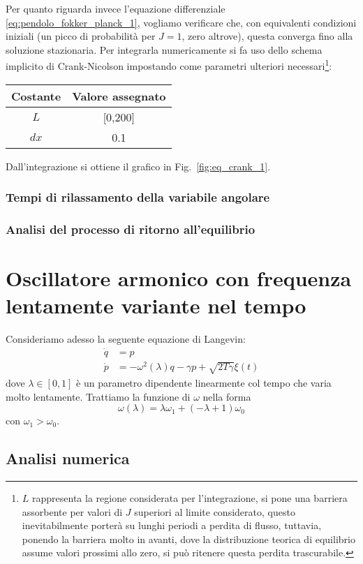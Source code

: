 \documentclass[10pt,a4paper]{article}
\begin{document}
Per quanto riguarda invece l'equazione differenziale \eqref{eq:pendolo_fokker_planck_1}, vogliamo verificare che, con equivalenti condizioni iniziali (un picco di probabilità per $J=1$, zero altrove), questa converga fino alla soluzione stazionaria. Per integrarla numericamente si fa uso dello schema implicito di Crank-Nicolson impostando come parametri ulteriori necessari\footnote{$L$ rappresenta la regione considerata per l'integrazione, si pone una barriera assorbente per valori di $J$ superiori al limite considerato, questo inevitabilmente porterà su lunghi periodi a perdita di flusso, tuttavia, ponendo la barriera molto in avanti, dove la distribuzione teorica di equilibrio assume valori prossimi allo zero, si può ritenere questa perdita trascurabile.}:
\begin{center}
	\begin{tabular}{cc}
	\toprule
	Costante & {Valore assegnato} \\
	\midrule
	$L$			& [0,200]	\\
	$dx$		& 0.1	\\
	\bottomrule
	\end{tabular}
	\label{tab:valori_2}
\end{center}
Dall'integrazione si ottiene il grafico in Fig.~\ref{fig:eq_crank_1}.



\subsubsection{Tempi di rilassamento della variabile angolare}

\subsubsection{Analisi del processo di ritorno all'equilibrio}



\section{Oscillatore armonico con frequenza lentamente variante nel tempo}

Consideriamo adesso la seguente equazione di Langevin:
\begin{align}
	\dot{q} &= p \\
	\dot{p} &= -\omega^2(\lambda)q - \gamma p + \sqrt{2T\gamma} \xi(t)
\end{align}
dove $\lambda\in[0,1]$ è un parametro dipendente linearmente col tempo che varia molto lentamente. Trattiamo la funzione di $\omega$ nella forma
\begin{equation}
 	\omega (\lambda) = \lambda \omega_1 + (-\lambda + 1) \omega_0
\end{equation} 
con $\omega_1 > \omega_0$.

\subsection{Analisi numerica}
\end{document}
